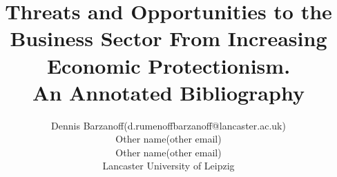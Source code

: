 \documentclass [11pt]{article}
\title{Threats and Opportunities to the Business Sector From
Increasing Economic Protectionism.\\\medskip An Annotated Bibliography}
\author{Dennis Barzanoff(d.rumenoffbarzanoff@lancaster.ac.uk)\\
Other name(other email)\\
Other name(other email)\\
Lancaster University of Leipzig}
\begin{document}
\maketitle
\nocite{*}
% 
\printbibliography
\end{document}
